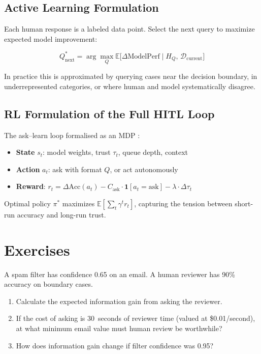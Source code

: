 \subsection{Active Learning Formulation}

Each human response is a labeled data point. Select the next query to maximize expected model improvement:

\[
Q^*_\text{next} = \arg\max_Q \mathbb{E}\bigl[\Delta\text{ModelPerf} \mid H_Q,\, \mathcal{D}_\text{current}\bigr]
\]

In practice this is approximated by querying cases near the decision boundary, in underrepresented categories, or where human and model systematically disagree.

\subsection{RL Formulation of the Full HITL Loop}

The ask--learn loop formalised as an MDP \autocite{christiano2017deep}:

\begin{itemize}
    \item \textbf{State} $s_t$: model weights, trust $\tau_t$, queue depth, context
    \item \textbf{Action} $a_t$: ask with format $Q$, or act autonomously
    \item \textbf{Reward}: $r_t = \Delta\text{Acc}(a_t) - C_\text{ask}\cdot\mathbf{1}[a_t=\text{ask}] - \lambda\cdot\Delta\tau_t$
\end{itemize}

Optimal policy $\pi^*$ maximizes $\mathbb{E}[\sum_t \gamma^t r_t]$, capturing the tension between short-run accuracy and long-run trust.

\section{Exercises}

\begin{Exercise}
A spam filter has confidence 0.65 on an email. A human reviewer has 90\% accuracy on boundary cases.
\begin{enumerate}
    \item Calculate the expected information gain from asking the reviewer.
    \item If the cost of asking is 30~seconds of reviewer time (valued at \$0.01/second), at what minimum email value must human review be worthwhile?
    \item How does information gain change if filter confidence was 0.95?
\end{enumerate}
\end{Exercise}

